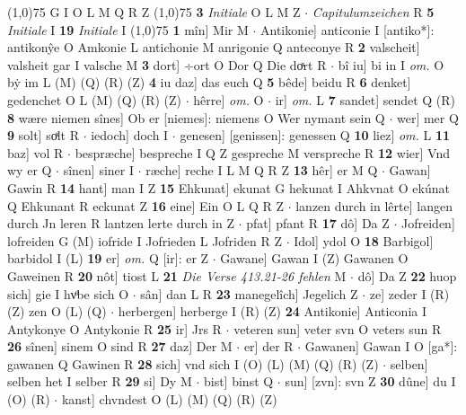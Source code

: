 \documentclass[8pt,a4paper,notitlepage]{article}
\begin{document}
\begin{table}[ht]
\begin{minipage}[t]{0.5\linewidth}
\begin{tabular}{rl}
\end{tabular}
\scriptsize
\line(1,0){75} \newline
G I O L M Q R Z \newline
\line(1,0){75} \newline
\textbf{3} \textit{Initiale} O L M Z   $\cdot$ \textit{Capitulumzeichen} R  \textbf{5} \textit{Initiale} I  \textbf{19} \textit{Initiale} I  \newline
\line(1,0){75} \newline
\textbf{1} mîn] Mir M  $\cdot$ Antikonie] anticonie I [antiko*]: antikonŷe O Amkonie L antichonie M anrigonie Q anteconye R \textbf{2} valscheit] valsheit gar I valsche M \textbf{3} dort] ÷ort O Dor Q Die doͯrt R  $\cdot$ bî iu] bi in I \textit{om.} O bẏ im L (M) (Q) (R) (Z) \textbf{4} iu daz] das euch Q \textbf{5} bêde] beidu R \textbf{6} denket] gedenchet O L (M) (Q) (R) (Z)  $\cdot$ hêrre] \textit{om.} O  $\cdot$ ir] \textit{om.} L \textbf{7} sandet] sendet Q (R) \textbf{8} wære niemen sînes] Ob er [niemes]: niemens O Wer nymant sein Q  $\cdot$ wer] mer Q \textbf{9} solt] soͯlt R  $\cdot$ iedoch] doch I  $\cdot$ genesen] [genissen]: genessen Q \textbf{10} liez] \textit{om.} L \textbf{11} baz] vol R  $\cdot$ bespræche] bespreche I Q Z gespreche M verspreche R \textbf{12} wier] Vnd wy er Q  $\cdot$ sînen] siner I  $\cdot$ ræche] reche I L M Q R Z \textbf{13} hêr] er M Q  $\cdot$ Gawan] Gawin R \textbf{14} hant] man I Z \textbf{15} Ehkunat] ekunat G hekunat I Ahkvnat O ekúnat Q Ehkunant R eckunat Z \textbf{16} eine] Ein O L Q R Z  $\cdot$ lanzen durch in lêrte] langen durch Jn leren R lantzen lerte durch in Z  $\cdot$ pfat] pfant R \textbf{17} dô] Da Z  $\cdot$ Jofreiden] lofreiden G (M) iofride I Jofrieden L Jofriden R Z  $\cdot$ Idol] ydol O \textbf{18} Barbigol] barbidol I (L) \textbf{19} er] \textit{om.} Q [ir]: er Z  $\cdot$ Gawane] Gawan I (Z) Gawanen O Gaweinen R \textbf{20} nôt] tiost L \textbf{21} \textit{Die Verse 413.21-26 fehlen} M   $\cdot$ dô] Da Z \textbf{22} huop sich] gie I hvͦbe sich O  $\cdot$ sân] dan L R \textbf{23} manegelîch] Jegelich Z  $\cdot$ ze] zeder I (R) (Z) zen O (L) (Q)  $\cdot$ herbergen] herberge I (R) (Z) \textbf{24} Antikonie] Anticonia I Antykonye O Antykonie R \textbf{25} ir] Jrs R  $\cdot$ veteren sun] veter svn O veters sun R \textbf{26} sînen] sinem O sind R \textbf{27} daz] Der M  $\cdot$ er] der R  $\cdot$ Gawanen] Gawan I O [ga*]: gawanen Q Gawinen R \textbf{28} sich] vnd sich I (O) (L) (M) (Q) (R) (Z)  $\cdot$ selben] selben het I selber R \textbf{29} si] Dy M  $\cdot$ bist] binst Q  $\cdot$ sun] [zvn]: svn Z \textbf{30} dûne] du I (O) (R)  $\cdot$ kanst] chvndest O (L) (M) (Q) (R) (Z) \newline

\end{minipage}
\end{table}
\end{document}
